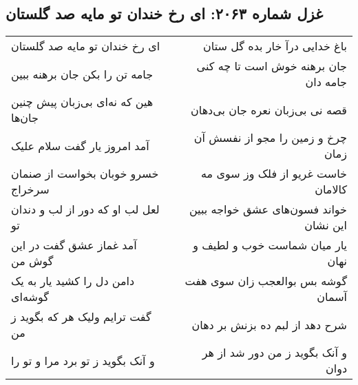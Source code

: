\begin{center}
\section*{غزل شماره ۲۰۶۳: ای رخ خندان تو مایه صد گلستان}
\label{sec:2063}
\begin{longtable}{l p{0.5cm} r}
ای رخ خندان تو مایه صد گلستان
&&
باغ خدایی درآ خار بده گل ستان
\\
جامه تن را بکن جان برهنه ببین
&&
جان برهنه خوش است تا چه کنی جامه دان
\\
هین که نه‌ای بی‌زبان پیش چنین جان‌ها
&&
قصه نی بی‌زبان نعره جان بی‌دهان
\\
آمد امروز یار گفت سلام علیک
&&
چرخ و زمین را مجو از نفسش آن زمان
\\
خسرو خوبان بخواست از صنمان سرخراج
&&
خاست غریو از فلک وز سوی مه کالامان
\\
لعل لب او که دور از لب و دندان تو
&&
خواند فسون‌های عشق خواجه ببین این نشان
\\
آمد غماز عشق گفت در این گوش من
&&
یار میان شماست خوب و لطیف و نهان
\\
دامن دل را کشید یار به یک گوشه‌ای
&&
گوشه بس بوالعجب زان سوی هفت آسمان
\\
گفت ترایم ولیک هر که بگوید ز من
&&
شرح دهد از لبم ده بزنش بر دهان
\\
و آنک بگوید ز تو برد مرا و تو را
&&
و آنک بگوید ز من دور شد از هر دوان
\\
\end{longtable}
\end{center}
